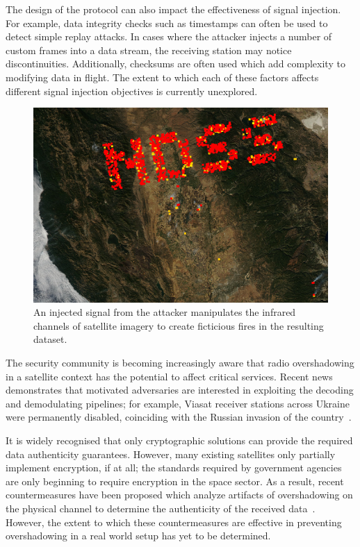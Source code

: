The design of the protocol can also impact the effectiveness of signal injection.
For example, data integrity checks such as timestamps can often be used to detect simple replay attacks.
In cases where the attacker injects a number of custom frames into a data stream, the receiving station may notice discontinuities.
Additionally, checksums are often used which add complexity to modifying data in flight.
The extent to which each of these factors affects different signal injection objectives is currently unexplored.

\begin{figure}
    \includegraphics[width=\columnwidth]{diagrams/injection/pixels_800_140.jpg}
    \caption{An injected signal from the attacker manipulates the infrared channels of satellite imagery to create ficticious fires in the resulting dataset.}
    \label{fig:location-injection}
\end{figure}

The security community is becoming increasingly aware that radio overshadowing in a satellite context has the potential to affect critical services.
Recent news demonstrates that motivated adversaries are interested in exploiting the decoding and demodulating pipelines; for example, Viasat receiver stations across Ukraine were permanently disabled, coinciding with the Russian invasion of the country~\cite{satcomAnalysis}.

It is widely recognised that only cryptographic solutions can provide the required data authenticity guarantees.
However, many existing satellites only partially implement encryption, if at all; the standards required by government agencies are only beginning to require encryption in the space sector.
As a result, recent countermeasures have been proposed which analyze artifacts of overshadowing on the physical channel to determine the authenticity of the received data~\cite{jedermann2021orbit,oligeri2020past}.
However, the extent to which these countermeasures are effective in preventing overshadowing in a real world setup has yet to be determined.

